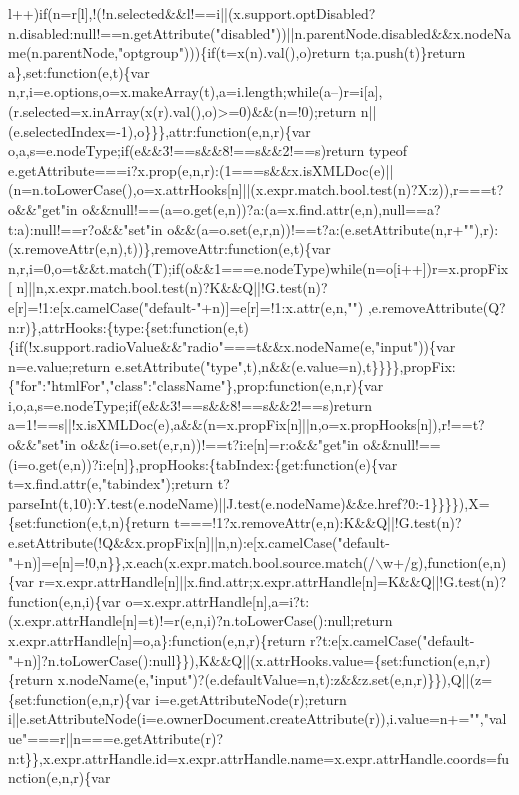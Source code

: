 \begin{DoxyCode}
{      l++)if(n=r[l],!(!n.selected&&l!==i||(x.support.optDisabled?n.disabled:null!==n.getAttribute("disabled"))||n.parentNode.disabled&&x.nodeName(n.parentNode,"optgroup")))\{if(t=x(n).val(),o)return t;a.push(t)\}return
       a\},set:function(e,t)\{var
       n,r,i=e.options,o=x.makeArray(t),a=i.length;while(a--)r=i[a],(r.selected=x.inArray(x(r).val(),o)>=0)&&(n=!0);return n||(e.selectedIndex=-1),o\}\}\},attr:function(e,n,r)\{var
       o,a,s=e.nodeType;if(e&&3!==s&&8!==s&&2!==s)return typeof
       e.getAttribute===i?x.prop(e,n,r):(1===s&&x.isXMLDoc(e)||(n=n.toLowerCase(),o=x.attrHooks[n]||(x.expr.match.bool.test(n)?X:z)),r===t?o&&"get"in
       o&&null!==(a=o.get(e,n))?a:(a=x.find.attr(e,n),null==a?t:a):null!==r?o&&"set"in
       o&&(a=o.set(e,r,n))!==t?a:(e.setAttribute(n,r+""),r):(x.removeAttr(e,n),t))\},removeAttr:function(e,t)\{var
       n,r,i=0,o=t&&t.match(T);if(o&&1===e.nodeType)while(n=o[i++])r=x.propFix[
      n]||n,x.expr.match.bool.test(n)?K&&Q||!G.test(n)?e[r]=!1:e[x.camelCase("default-"+n)]=e[r]=!1:x.attr(e,n,"")
      ,e.removeAttribute(Q?n:r)\},attrHooks:\{type:\{set:function(e,t)\{if(!x.support.radioValue&&"radio"===t&&x.nodeName(e,"input"))\{var n=e.value;return
       e.setAttribute("type",t),n&&(e.value=n),t\}\}\}\},propFix:\{"for":"htmlFor","class":"className"\},prop:function(e,n,r)\{var i,o,a,s=e.nodeType;if(e&&3!==s&&8!==s&&2!==s)return
       a=1!==s||!x.isXMLDoc(e),a&&(n=x.propFix[n]||n,o=x.propHooks[n]),r!==t?o&&"set"in
       o&&(i=o.set(e,r,n))!==t?i:e[n]=r:o&&"get"in o&&null!==(i=o.get(e,n))?i:e[n]\},propHooks:\{tabIndex:\{get:function(e)\{var
       t=x.find.attr(e,"tabindex");return
       t?parseInt(t,10):Y.test(e.nodeName)||J.test(e.nodeName)&&e.href?0:-1\}\}\}\}),X=\{set:function(e,t,n)\{return
       t===!1?x.removeAttr(e,n):K&&Q||!G.test(n)?e.setAttribute(!Q&&x.propFix[n]||n,n):e[x.camelCase("default-"+n)]=e[n]=!0,n\}\},x.each(x.expr.match.bool.source.match(/\(\backslash\)w+/g),function(e,n)\{var
       r=x.expr.attrHandle[n]||x.find.attr;x.expr.attrHandle[n]=K&&Q||!G.test(n)?function(e,n,i)\{var
       o=x.expr.attrHandle[n],a=i?t:(x.expr.attrHandle[n]=t)!=r(e,n,i)?n.toLowerCase():null;return x.expr.attrHandle[n]=o,a\}:function(e,n,r)\{return
       r?t:e[x.camelCase("default-"+n)]?n.toLowerCase():null\}\}),K&&Q||(x.attrHooks.value=\{set:function(e,n,r)\{return
       x.nodeName(e,"input")?(e.defaultValue=n,t):z&&z.set(e,n,r)\}\}),Q||(z=\{set:function(e,n,r)\{var
       i=e.getAttributeNode(r);return
       i||e.setAttributeNode(i=e.ownerDocument.createAttribute(r)),i.value=n+="","value"===r||n===e.getAttribute(r)?n:t\}\},x.expr.attrHandle.id=x.expr.attrHandle.name=x.expr.attrHandle.coords=function(e,n,r)\{var
}
\end{DoxyCode}
